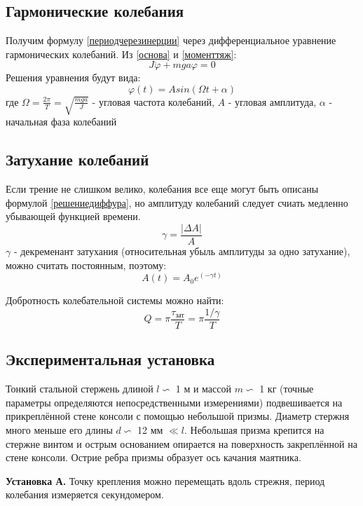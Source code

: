 \documentclass[a4paper,12pt]{article} %
\begin{document}
\subsection{Гармонические колебания}
Получим формулу \ref{периодчерезинерции} через дифференциальное уравнение гармонических колебаний. Из \ref{основа} и \ref{моменттяж}:
\begin{equation}
\label{вращдиффур}
J\ddot{\varphi}+mga\varphi=0
\end{equation}
Решения уравнения будут вида:
\begin{equation}
\label{решениедиффура}
\varphi(t)=Asin(\Omega t+\alpha)
\end{equation}
где \(\Omega=\frac{2\pi}{T}=\sqrt{\frac{mga}{J}}\) - угловая частота колебаний, $A$ - угловая амплитуда, $\alpha$ - начальная фаза колебаний
\subsection{Затухание колебаний}
Если трение не слишком велико, колебания все еще могут быть описаны формулой \ref{решениедиффура}, но амплитуду колебаний следует счиать медленно убывающей функцией времени.
\[\gamma=\frac{|\Delta A|}{A}\]
$\gamma$ - декременант затухания (относительная убыль амплитуды за одно затухание), можно считать постоянным, поэтому:
\begin{equation}
\label{затухание}
A(t)=A_0e^{(-\gamma t)}
\end{equation} 

Добротность колебательной системы можно найти:
\begin{equation}
Q=\pi \frac{\tau_{\text{зат}}}{T}=\pi \frac{1/\gamma}{T}
\end{equation}
\subsection{Экспериментальная установка}
Тонкий стальной стержень длиной $l \backsim$ 1 м и массой $m \backsim$ 1 кг (точные
параметры определяются непосредственными измерениями) подвешивается на прикреплённой стене консоли с помощью небольшой призмы. Диаметр стержня много меньше его длины $d \backsim$ 12 мм $\ll l$. Небольшая призма
крепится на стержне винтом и острым основанием опирается на поверхность закреплённой на стене консоли. Острие ребра призмы образует ось
качания маятника.

\textbf{Установка А.}
Точку крепления можно перемещать вдоль стрежня, период колебания измеряется секундомером.
\end{document}
